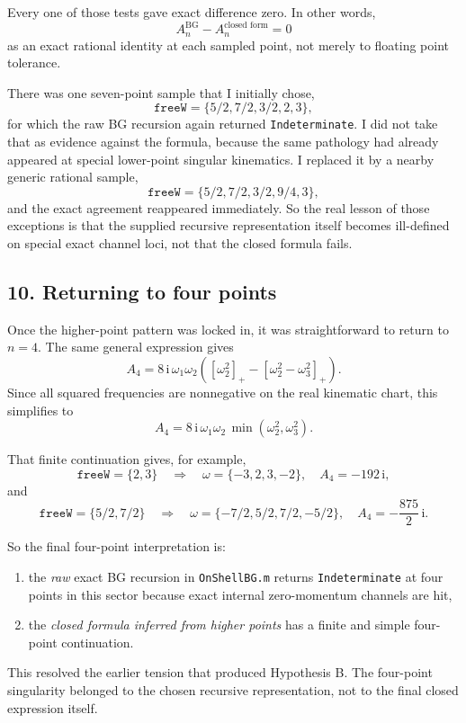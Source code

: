 \documentclass[11pt]{article}
\newcommand{\pp}[1]{\left[#1\right]_+}
\newcommand{\ii}{\mathrm{i}}
\begin{document}
Every one of those tests gave exact difference zero. In other words,
\[
A_n^{\text{BG}} - A_n^{\text{closed form}} = 0
\]
as an exact rational identity at each sampled point, not merely to floating
point tolerance.

There was one seven-point sample that I initially chose,
\[
\texttt{freeW}=\{5/2,7/2,3/2,2,3\},
\]
for which the raw BG recursion again returned \texttt{Indeterminate}. I did not
take that as evidence against the formula, because the same pathology had
already appeared at special lower-point singular kinematics. I replaced it by a
nearby generic rational sample,
\[
\texttt{freeW}=\{5/2,7/2,3/2,9/4,3\},
\]
and the exact agreement reappeared immediately. So the real lesson of those
exceptions is that the supplied recursive representation itself becomes
ill-defined on special exact channel loci, not that the closed formula fails.

\subsection*{10. Returning to four points}

Once the higher-point pattern was locked in, it was straightforward to return
to $n=4$. The same general expression gives
\[
A_4
=
8\,\ii\,\omega_1\omega_2\left(\pp{\omega_2^2}-\pp{\omega_2^2-\omega_3^2}\right).
\]
Since all squared frequencies are nonnegative on the real kinematic chart, this
simplifies to
\[
A_4
=
8\,\ii\,\omega_1\omega_2\,\min(\omega_2^2,\omega_3^2).
\]

That finite continuation gives, for example,
\[
\texttt{freeW}=\{2,3\}
\quad\Longrightarrow\quad
\omega=\{-3,2,3,-2\},
\quad
A_4=-192\,\ii,
\]
and
\[
\texttt{freeW}=\{5/2,7/2\}
\quad\Longrightarrow\quad
\omega=\{-7/2,5/2,7/2,-5/2\},
\quad
A_4=-\frac{875}{2}\,\ii.
\]

So the final four-point interpretation is:

\begin{enumerate}
\item the \emph{raw} exact BG recursion in \texttt{OnShellBG.m} returns
\texttt{Indeterminate} at four points in this sector because exact internal
zero-momentum channels are hit,
\item the \emph{closed formula inferred from higher points} has a finite and
simple four-point continuation.
\end{enumerate}

This resolved the earlier tension that produced Hypothesis B. The four-point
singularity belonged to the chosen recursive representation, not to the final
closed expression itself.
\end{document}
